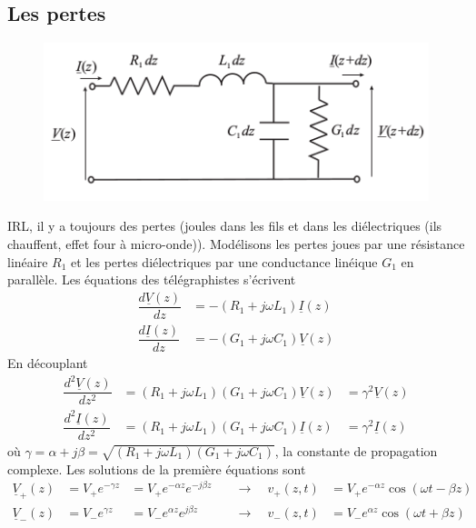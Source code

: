 	\subsection{Les pertes}
	\begin{figure}
	\vspace{-7mm}
	\includegraphics[scale=0.45]{ch2/image7.png}
	\end{figure}
	IRL, il y a toujours des pertes (joules dans les fils et dans les diélectriques 
	(ils chauffent, effet four à micro-onde)). 
	Modélisons les pertes joues par une résistance linéaire $R_1$ et les pertes 
	diélectriques par une conductance linéique $G_1$ en parallèle. Les équations des 
	télégraphistes s'écrivent
	\begin{equation}
	\begin{array}{ll}
	\dfrac{d\underline{V}(z)}{dz} &= -(R_1+j\omega L_1)\underline{I}(z)\\
	\dfrac{d\underline{I}(z)}{dz} &= -(G_1+j\omega C_1)\underline{V}(z)	
	\end{array}
	\end{equation}
	En découplant
	\begin{equation}
	\begin{array}{lll}
	\dfrac{d^2\underline{V}(z)}{dz^2} &= (R_1+j\omega L_1)(G_1+j\omega C_1)\underline{V}(z)
	&= \gamma^2\underline{V}(z)\\
	\dfrac{d^2\underline{I}(z)}{dz^2} &= (R_1+j\omega L_1)(G_1+j\omega C_1)\underline{I}(z)
	&= \gamma^2\underline{I}(z)	
	\end{array}
	\end{equation}
	où $\gamma = \alpha+j\beta= \sqrt{(R_1+j\omega L_1)(G_1+j\omega C_1)}$, la constante de 
	propagation complexe. Les solutions de la première équations sont
	\begin{equation}
	\begin{array}{lllll}
	\underline{V}_+(z) &= V_+e^{-\gamma z} &= V_+e^{-\alpha z}e^{-j\beta z} \quad &\rightarrow
	\quad v_+(z,t) &= 	V_+e^{-\alpha z}\cos(\omega t-\beta z)\\
	\underline{V}_-(z) &= V_-e^{\gamma z} &= V_-e^{\alpha z}e^{j\beta z}  \quad &\rightarrow
	\quad v_-(z,t) &= 	V_-e^{\alpha z}\cos(\omega t+\beta z)	
	\end{array}
	\end{equation}
